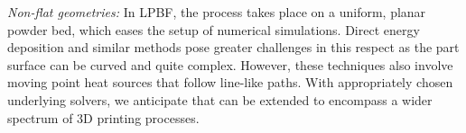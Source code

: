 \documentclass[conference]{IEEEtran}
\begin{document}
\begin{itemize*}
\item \emph{Non-flat geometries:}
In LPBF, the process takes place on a uniform, planar powder bed, which eases the setup of numerical simulations.  
Direct energy deposition and similar methods pose greater challenges in this respect as the part surface can be curved and quite complex.
However, these techniques also involve moving point heat sources that follow line-like paths.
With appropriately chosen underlying solvers, we anticipate that \method can be extended to encompass a wider spectrum of 3D printing processes.

\end{itemize*}

\end{document}
